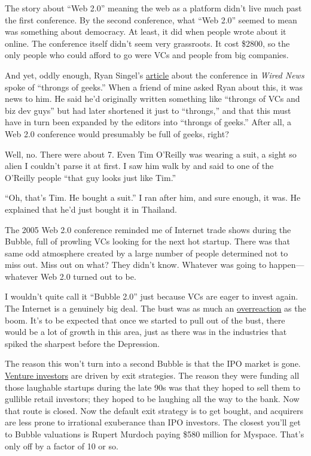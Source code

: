 The story about ``Web 2.0'' meaning the web as a platform didn't live
much past the first conference. By the second conference, what ``Web
2.0'' seemed to mean was something about democracy. At least, it did
when people wrote about it online. The conference itself didn't seem
very grassroots. It cost \$2800, so the only people who could afford to
go were VCs and people from big companies.

And yet, oddly enough, Ryan Singel's
\href{http://www.wired.com/news/technology/0,1282,69114,00.html}{article}
about the conference in \emph{Wired News} spoke of ``throngs of geeks.''
When a friend of mine asked Ryan about this, it was news to him. He said
he'd originally written something like ``throngs of VCs and biz dev
guys'' but had later shortened it just to ``throngs,'' and that this
must have in turn been expanded by the editors into ``throngs of
geeks.'' After all, a Web 2.0 conference would presumably be full of
geeks, right?

Well, no. There were about 7. Even Tim O'Reilly was wearing a suit, a
sight so alien I couldn't parse it at first. I saw him walk by and said
to one of the O'Reilly people ``that guy looks just like Tim.''

``Oh, that's Tim. He bought a suit.'' I ran after him, and sure enough,
it was. He explained that he'd just bought it in Thailand.

The 2005 Web 2.0 conference reminded me of Internet trade shows during
the Bubble, full of prowling VCs looking for the next hot startup. There
was that same odd atmosphere created by a large number of people
determined not to miss out. Miss out on what? They didn't know. Whatever
was going to happen---whatever Web 2.0 turned out to be.

I wouldn't quite call it ``Bubble 2.0'' just because VCs are eager to
invest again. The Internet is a genuinely big deal. The bust was as much
an \href{http://www.paulgraham.com/bubble.html}{overreaction} as the
boom. It's to be expected that once we started to pull out of the bust,
there would be a lot of growth in this area, just as there was in the
industries that spiked the sharpest before the Depression.

The reason this won't turn into a second Bubble is that the IPO market
is gone. \href{startupfunding.html}{Venture investors} are driven by
exit strategies. The reason they were funding all those laughable
startups during the late 90s was that they hoped to sell them to
gullible retail investors; they hoped to be laughing all the way to the
bank. Now that route is closed. Now the default exit strategy is to get
bought, and acquirers are less prone to irrational exuberance than IPO
investors. The closest you'll get to Bubble valuations is Rupert Murdoch
paying \$580 million for Myspace. That's only off by a factor of 10 or
so.

